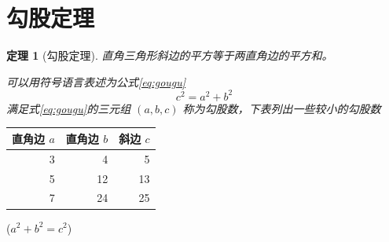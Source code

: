 \documentclass[fontset=fandol]{ctexart}
\begin{document}
\section{勾股定理}
\newtheorem{thm}{定理}
\begin{thm}[勾股定理]
直角三角形斜边的平方等于两直角边的平方和。

可以用符号语言表述为公式\ref{eq:gougu}
\begin{equation}\label{eq:gougu}
c^2 = a^2 + b^2
\end{equation}
满足式\ref{eq:gougu}的三元组 $(a, b, c)$ 称为\emph{勾股数}，下表列出一些较小的勾股数
\end{thm}
\begin{table}[H]
\begin{tabular}{|r|r|r|}
\hline
直角边 $a$ & 直角边 $b$ & 斜边 $c$ \\
\hline
    3 &     4 &     5 \\
    5 &    12 &    13 \\
    7 &    24 &    25 \\
\hline
\end{tabular}%
\qquad
($a^2 + b^2 = c^2$)
\end{table}
\nocite{Shiye}

\end{document}
